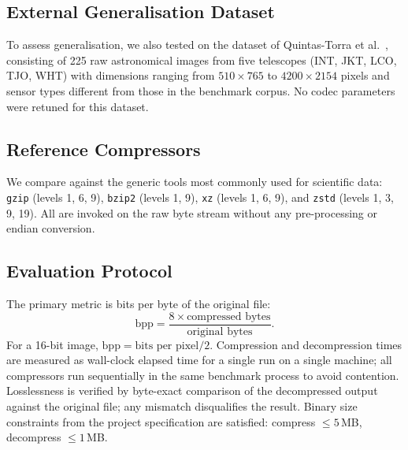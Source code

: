 \subsection{External Generalisation Dataset}
To assess generalisation, we also tested \allrounder{} on the dataset
of Quintas-Torra et al.~\cite{quintas2026}, consisting of 225 raw
astronomical images from five telescopes (INT, JKT, LCO, TJO, WHT)
with dimensions ranging from $510\times765$ to $4200\times2154$ pixels
and sensor types different from those in the benchmark corpus.
No codec parameters were retuned for this dataset.

\subsection{Reference Compressors}
We compare against the generic tools most commonly used for scientific data:
\texttt{gzip} (levels 1, 6, 9), \texttt{bzip2} (levels 1, 9),
\texttt{xz} (levels 1, 6, 9), and \texttt{zstd} (levels 1, 3, 9, 19).
All are invoked on the raw byte stream without any pre-processing or
endian conversion.
\subsection{Evaluation Protocol}
The primary metric is bits per byte of the original file:
\[
  \text{bpp} = \frac{8 \times \text{compressed bytes}}{\text{original bytes}}.
\]
For a 16-bit image, $\text{bpp} = \text{bits per pixel}/2$.
Compression and decompression times are measured as wall-clock elapsed time
for a single run on a single machine; all compressors run sequentially in
the same benchmark process to avoid contention.
Losslessness is verified by byte-exact comparison of the decompressed output
against the original file; any mismatch disqualifies the result.
Binary size constraints from the project specification are satisfied:
compress $\le 5$\,MB, decompress $\le 1$\,MB.

